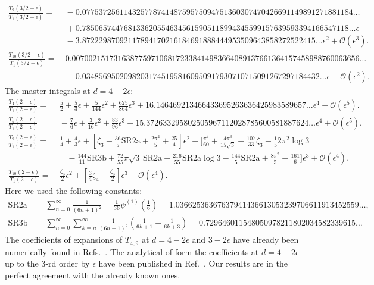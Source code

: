 \documentclass[sort&compress]{elsarticle}
\newcommand{\D}{d}
\begin{document}
\begin{align}
	\frac{T_9(3/2-\epsilon)}{T_1(3/2-\epsilon)} =&\ -0.07753725611432577874148759575094751360307470426691149891271881184\ldots \nonumber\\
	&\ +0.7850657447681336205546345615905118994345599157639593394166547118\ldots\epsilon \nonumber\\
	&\ -3.87222987092117894170216184691888444953509643858272522415\ldots\epsilon^2  + \mathcal{O}(\epsilon^3). \\
	\frac{T_{10}(3/2-\epsilon)}{T_1(3/2-\epsilon)} =&\ 0.007002151731638775971068172338414983664089137661364157458988760063656\ldots \nonumber\\
	&\ -0.034856950209820317451958160950917930710715091267297184432\ldots\epsilon  + \mathcal{O}(\epsilon^2).
\end{align}
The master integrals at $\D=4-2\epsilon$:
\begin{align}
	\frac{T_4(2-\epsilon)}{T_1(2-\epsilon)} =&\ \frac{5}{2} + \frac{5}{3}\epsilon + \frac{5}{144}\epsilon^2 + \frac{625}{864}\epsilon^3 +
	16.146469213466433695263636425983589657\ldots\epsilon^4 + \mathcal{O}(\epsilon^5). \\
	\frac{T_5(2-\epsilon)}{T_1(2-\epsilon)} =&\ -\frac{7}{6}\epsilon + \frac{3}{16}\epsilon^2 + \frac{83}{96}\epsilon^3 + 
	15.372633295802505967112028785600581887624\ldots\epsilon^4 + \mathcal{O}(\epsilon^5). \\
	\frac{T_9(2-\epsilon)}{T_1(2-\epsilon)} =&\ 
	\frac14+\frac43\epsilon + \left[\zeta _3-\frac{36}{5}\text{SR2a}+\frac{2 \pi ^2}{5}+\frac{25}{4}\right]\epsilon^2 + \bigg[\frac{\pi^4}{60} +\frac{4 \pi ^3}{15 \sqrt{3}} - \frac{107}{33}\zeta_3 -\frac{1}{5} 2 \pi ^2 \log 3 \nonumber\\
	&\ \ \ \ \ -\frac{144}{11}\text{SR3b} + \frac{72}{55}\pi\sqrt{3}\,\text{SR2a}+\frac{216}{55} \text{SR2a} \log 3 -\frac{144}{5}\text{SR2a} +\frac{8 \pi ^2}{5}+\frac{161}{6} \bigg] \epsilon^3  + \mathcal{O}(\epsilon^4).
	\\
	\frac{T_{10}(2-\epsilon)}{T_1(2-\epsilon)} =&\ \frac{\zeta_3}{2} \epsilon^2 + \left[ \frac{3}{4}\zeta_4 - \frac{\zeta_3}{2}\right] \epsilon^3  + \mathcal{O}(\epsilon^4).
\end{align}
Here we used the following constants:
\begin{align}
	\text{SR2a} &= \sum_{n=0}^{\infty} \frac{1}{(6 n+1)^2} = \frac{1}{36} \psi^{(1)}\!\left(\frac{1}{6}\right) = 1.03662536367637941436613053239706611913452559\ldots, \\
	\text{SR3b} &= \sum_{n=0}^{\infty} \sum_{k=n}^{\infty} \frac{1}{(6 n+1)^2} \left( \frac{1}{6 k+1}-\frac{1}{6 k+3} \right) = 0.729646011548050978211802034582339615\ldots
\end{align}
The coefficients of expansions of $T_{4,9}$ at $\D=4-2\epsilon$ and $3-2\epsilon$ have already been numerically found in Refs.~\cite{Laporta2002,SchroderVuorinen2003}.
The analytical of form the coefficients at $\D=4-2\epsilon$ up to the $3$-rd order by $\epsilon$ have been published in Ref.~\cite{Czakon:2005:4loop-tadpoles}.
Our results are in the perfect agreement with the already known ones.
\end{document}
